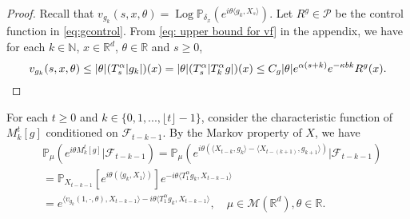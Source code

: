 \documentclass[12pt, a4paper]{amsart}
\theoremstyle{definition}
\numberwithin{equation}{section}
\begin{document}
\begin{proof}
    Recall that $v_{g_k}(s,x,\theta)=\operatorname{Log}\mathbb{P}_{\delta_x}(e^{i\theta \langle g_k, X_s \rangle})$.
    Let $R^g \in \mathcal P$ be the control function in \eqref{eq:gcontrol}.
    From \eqref{eq: upper bound for vf} in the appendix, we have for each $k \in \mathbb{N}$, $x\in\mathbb{R}^d$, $\theta\in \mathbb{R}$ and $s\geq 0$,
\begin{equation}
    v_{g_k}(s,x,\theta)
    \leq |\theta| (T_s^\alpha |g_k|) (x)
    = |\theta| (T_{s}^\alpha |T^\alpha_k g|) (x)
    \leq C_g|\theta| e^{\alpha(s+k)}e^{-\kappa bk}R^g(x).
    \qedhere
\end{equation}
\end{proof}
    For each $t \geq 0 $ and $k \in \{0,1,...,\lfloor t \rfloor-1\}$, consider the characteristic function of $M^t_k[g]$ conditioned on $\mathcal{F}_{t-k-1}$.
    By the Markov property of $X$, we have
 \begin{align*}
    &\mathbb{P}_{\mu}(e^{i\theta M_k^t[g]}|\mathcal{F}_{t-k-1})
    =\mathbb{P}_{\mu}(e^{i\theta (\langle X_{t-k},g_k\rangle - \langle X_{t-(k+1)},g_{k+1}\rangle)}|\mathcal{F}_{t-k-1})
    \\&=\mathbb P_{X_{t-k-1}} [e^{i\theta(\langle g_k,X_1\rangle)}]e^{-i\theta \langle T_1^{\alpha}g_k,X_{t-k-1}\rangle}
    \\&= e^{\langle v_{g_k}(1,\cdot,\theta),X_{t-k-1}\rangle -i \theta\langle T_1^{\alpha}g_k,X_{t-k-1}\rangle},
    \quad \mu \in \mathcal M(\mathbb R^d), \theta \in \mathbb R.
\end{align*}
\end{document}
